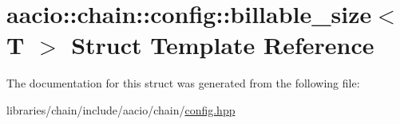 \hypertarget{structaacio_1_1chain_1_1config_1_1billable__size}{}\section{aacio\+:\+:chain\+:\+:config\+:\+:billable\+\_\+size$<$ T $>$ Struct Template Reference}
\label{structaacio_1_1chain_1_1config_1_1billable__size}


The documentation for this struct was generated from the following file\+:\begin{DoxyCompactItemize}
\item 
libraries/chain/include/aacio/chain/\mbox{\hyperlink{libraries_2chain_2include_2aacio_2chain_2config_8hpp}{config.\+hpp}}\end{DoxyCompactItemize}
